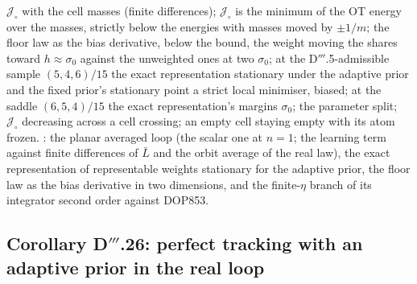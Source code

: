 \begin{itemize}
    $\mathcal{J}_\circ$ with the cell masses (finite differences); $\mathcal{J}_\circ$ is the minimum of the OT energy
    over the masses, strictly below the energies with masses moved by $\pm1/m$; the floor law as the bias derivative,
    below the bound, the weight moving the shares toward $h\approx\sigma_0$ against the unweighted ones at two
    $\sigma_0$; at the D$'''$.5-admissible sample $(5,4,6)/15$ the exact representation stationary under the adaptive
    prior and the fixed prior's stationary point a strict local minimiser, biased; at the saddle $(6,5,4)/15$ the exact
    representation's margins $\sigma_0$; the parameter split; $\mathcal{J}_\circ$ decreasing across a cell crossing;
    an empty cell staying empty with its atom frozen. : the planar averaged loop (the
    scalar one at $n=1$; the learning term against finite differences of $\bar L$ and the orbit average of the real
    law), the exact representation of representable weights stationary for the adaptive prior, the floor law as the
    bias derivative in two dimensions, and the finite-$\eta$ branch of its integrator second order against DOP853.
\end{itemize}

\subsection{Corollary D\texorpdfstring{$'''$}{'''}.26: perfect tracking with an adaptive prior in the real loop}

